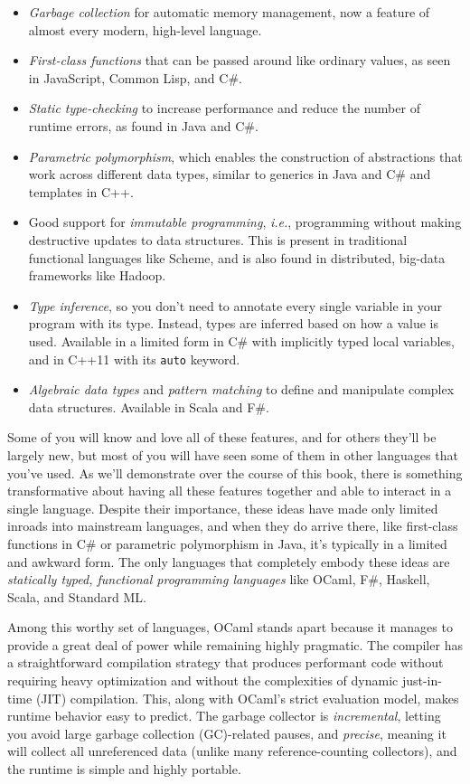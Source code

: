 \begin{itemize}
\item
  \emph{Garbage collection} for automatic memory management, now a
  feature of almost every modern, high-level language.
\item
  \emph{First-class functions} that can be passed around like ordinary
  values, as seen in JavaScript, Common Lisp, and C\#.
\item
  \emph{Static type-checking} to increase performance and reduce the
  number of runtime errors, as found in Java and C\#.
\item
  \emph{Parametric polymorphism}, which enables the construction of
  abstractions that work across different data types, similar to
  generics in Java and C\# and templates in {C++.}
\item
  Good support for \emph{immutable programming}, \emph{i.e.},
  programming without making destructive updates to data structures.
  This is present in traditional functional {languages} like Scheme, and
  is also found in distributed, big-data frameworks like Hadoop.
\item
  \emph{Type inference}, so you don't need to annotate every single
  variable in your program with its type. Instead, types are inferred
  based on how a value is used. Available in a limited form in C\# with
  implicitly typed local variables, and in C++11 with its
  \passthrough{\lstinline!auto!} keyword.
\item
  \emph{Algebraic data types} and \emph{pattern matching} to define and
  manipulate complex data structures. Available in Scala and F\#.
\end{itemize}

Some of you will know and love all of these features, and for others
they'll be largely new, but most of you will have seen some of them in
other languages that you've used. As we'll demonstrate over the course
of this book, there is something transformative about having all these
features together and able to interact in a single language. Despite
their importance, these ideas have made only limited inroads into
mainstream languages, and when they do arrive there, like first-class
functions in C\# or parametric polymorphism in Java, it's typically in a
limited and awkward form. The only languages that completely embody
these ideas are \emph{statically typed, functional programming
languages} like OCaml, F\#, Haskell, Scala, and Standard
ML.

Among this worthy set of languages, OCaml stands apart because it
manages to provide a great deal of power while remaining highly
pragmatic. The compiler has a straightforward compilation strategy that
produces performant code without requiring heavy optimization and
without the complexities of dynamic just-in-time (JIT) compilation.
This, along with OCaml's strict evaluation model, makes runtime behavior
easy to predict. The garbage collector is \emph{incremental}, letting
you avoid large garbage collection (GC)-related pauses, and
\emph{precise}, meaning it will collect all unreferenced data (unlike
many reference-counting collectors), and the runtime is simple and
highly portable.

